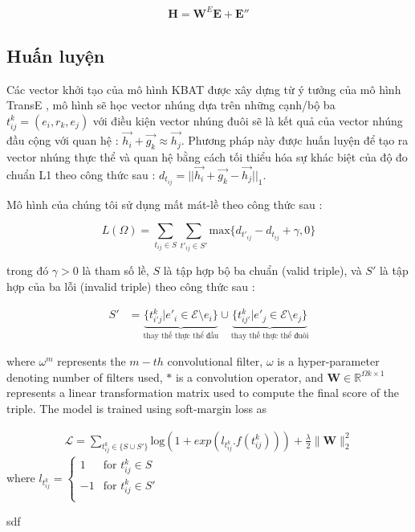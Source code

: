 \begin{align}
\mathbf{H} = \mathbf{W}^E \mathbf{E} + \mathbf{E''}
\end{align}

\subsection{Huấn luyện}
\label{sec:KBATTraning}

Các vector khởi tạo của mô hình KBAT được xây dựng từ ý tưởng của mô hình TransE \cite{bordes2013translating}, mô hình sẽ học vector nhúng dựa trên những cạnh/bộ ba $t^k_{ij} = (e_i, r_k, e_j)$ với điều kiện vector nhúng đuôi sẽ là kết quả của vector nhúng đầu cộng với quan hệ : $\vec{h_i}+\vec{g_k} \approx \vec{h_j}$. Phương pháp này được huấn luyện để tạo ra vector nhúng thực thể và quan hệ bằng cách tối thiểu hóa sự khác biệt của độ đo chuẩn L1 theo công thức sau :
$d_{t_{ij}} = \big|\big|\vec{h_i}+ \vec{g_k}-\vec{h_j}\big|\big|_1$.

Mô hình của chúng tôi sử dụng mất mát-lề theo công thức sau :

\begin{equation}
L(\Omega)=\sum_{t_{ij} \in S} \sum_{t'_{ij} \in S'} \text{max}\{d_{t'_{ij}} - d_{t_{ij}} + \gamma , 0 \}
\end{equation}

trong đó $\gamma > 0$ là tham số lề, $S$ là tập hợp bộ ba chuẩn (valid triple), và $S'$ là tập hợp của ba lỗi (invalid triple) theo công thức sau :

\begin{align}
{S'}&={\underbrace{\{ t^k_{i'j} | e'_i \in \mathcal{E}\setminus e_i\}}_{\text{thay thế thực thể đầu}}\cup \underbrace{\{ t^k_{ij'} | e'_j \in \mathcal{E}\setminus e_j\}}_{\text{thay thế thực thể đuôi}}}
\end{align}

where $\omega^m$ represents the $m-th$ convolutional filter,
\(\omega\) is a hyper-parameter denoting number of filters
used, \(\ast\) is a convolution operator, and \(\mathbf{W} \in \mathbb{R}^{\Omega k \times 1}\)
represents a linear transformation matrix used to
compute the final score of the triple. The model is
trained using soft-margin loss as

\begin{align}
\mathcal{L} = \sum_{t^k_{ij} \in \{S \cup S'\}} \text{log}(1 + exp(l_{t^k_{ij}} . f(t^k_{ij}))) + \frac{\lambda}{2} \parallel{\mathbf{W}}\parallel_2^2
\end{align}
where $l_{t^k_{ij}} = \begin{cases}
1 &\text{for } t^k_{ij} \in S \\
-1 &\text{for } t^k_{ij} \in S' \\
\end{cases}$

sdf